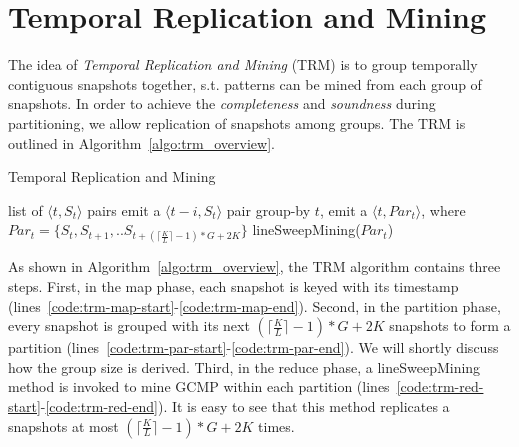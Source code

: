 \section{Temporal Replication and Mining}
\label{sec:trm_solution}
The idea of \emph{Temporal Replication and Mining} (TRM)
is to group temporally contiguous snapshots together, s.t. patterns can be
mined from each group of snapshots. In order to achieve the \emph{completeness}
and \emph{soundness} during partitioning, we allow replication of
snapshots among groups. The TRM is outlined in Algorithm~\ref{algo:trm_overview}.

\begin{algorithm}
\caption{Temporal Replication and Mining}
\label{algo:trm_overview}
\begin{algorithmic}[1]
\Require list of $\langle t, S_t \rangle$ pairs
\label{code:trm-map-start}
		\State emit a $\langle t-i, S_t \rangle$ pair
	\EndFor 
\EndFor
\label{code:trm-map-end}
\label{code:trm-par-start}
\State group-by $t$, emit a $\langle t, Par_t\rangle$,
\State  where $Par_t = \{S_t, S_{t+1}, .. S_{t+(\lceil \frac{K}{L} \rceil -1)*G+2K}\} $
\EndFor
\label{code:trm-par-end}
\label{code:trm-red-start}
\State lineSweepMining($Par_t$)
\label{code:trm-red-end}
\EndFor
\end{algorithmic}
\end{algorithm}

As shown in Algorithm~\ref{algo:trm_overview}, the TRM algorithm contains
three steps. First, in the map phase, each snapshot is keyed 
with its timestamp (lines~\ref{code:trm-map-start}-\ref{code:trm-map-end}). 
Second, in the partition phase, every snapshot is grouped with its next 
$(\lceil \frac{K}{L} \rceil -1)*G+2K$ snapshots to form a partition (lines~\ref{code:trm-par-start}-\ref{code:trm-par-end}). We will shortly discuss how the group size is derived. 
Third, in the reduce phase, a lineSweepMining method is invoked 
to mine GCMP within each partition (lines~\ref{code:trm-red-start}-\ref{code:trm-red-end}). 
It is easy to see that this method replicates a snapshots 
at most $(\lceil \frac{K}{L} \rceil -1)*G+2K$ times.

